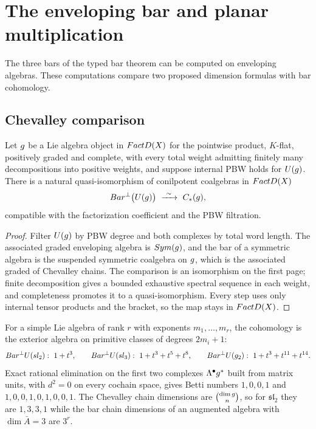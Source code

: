 \chapter{The enveloping bar and planar multiplication}
\label{ch:enveloping-bar}

The three bars of the typed bar theorem can be computed on enveloping
algebras. These computations compare two proposed dimension formulas with
bar cohomology.

\section{Chevalley comparison}

\begin{theorem}
\label{thm:bar-chevalley-spine}
Let $g$ be a Lie algebra object in $FactD(X)$ for the pointwise product,
$K$-flat, positively graded and complete, with every total weight admitting
finitely many decompositions into positive weights, and suppose internal PBW
holds for $U(g)$. There is a natural quasi-isomorphism of conilpotent
coalgebras in $FactD(X)$
\[
 \BarPerp\bigl(U(\g)\bigr)\ \xrightarrow{\ \sim\ }\ C_*(\g),
\]
compatible with the factorization coefficient and the PBW filtration.
\end{theorem}
\begin{proof}
Filter $U(g)$ by PBW degree and both complexes by total word length. The
associated graded enveloping algebra is $Sym(g)$, and the bar of a symmetric
algebra is the suspended symmetric coalgebra on $g$, which is the associated
graded of Chevalley chains. The comparison is an isomorphism on the first page;
finite decomposition gives a bounded exhaustive spectral sequence in each
weight, and completeness promotes it to a quasi-isomorphism. Every step uses
only internal tensor products and the bracket, so the map stays in $FactD(X)$.
\end{proof}

\begin{calculation}
\label{calc:simple-spine}
For a simple Lie algebra of rank $r$ with exponents $m_1,\dots,m_r$, the
cohomology is the exterior algebra on primitive classes of degrees $2m_i+1$:
\[
 Bar^{\perp} U(sl_2):\ 1+t^3,
 \qquad
 Bar^{\perp} U(sl_3):\ 1+t^3+t^5+t^8,
 \qquad
 Bar^{\perp} U(g_2):\ 1+t^3+t^{11}+t^{14}.
\]
Exact rational elimination on the first two complexes
$\Lambda^\bullet g^*$ built from matrix units, with $d^2=0$ on every
cochain space, gives Betti numbers $1,0,0,1$ and
$1,0,0,1,0,1,0,0,1$. The Chevalley chain dimensions are
$\binom{\dim g}{n}$, so for $\mathfrak{sl}_2$ they are $1,3,3,1$ while the bar
chain dimensions of an augmented algebra with $\dim\bar A=3$ are $3^r$.
\end{calculation}


